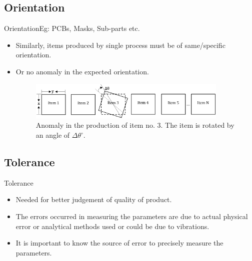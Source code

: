 \documentclass{beamer}
\begin{document}
\subsection{Orientation}

\begin{frame}{Orientation}{Eg: PCBs, Masks, Sub-parts etc.}
  \begin{itemize}
  \item Similarly, items produced by single process must be of same/specific orientation.
  \item Or no anomaly in the expected orientation.
  \begin{figure}
    \includegraphics[width=0.9\textwidth]{orientation}
    \caption{Anomaly in the production of item no. $3$. The item is rotated by an angle of $\Delta\theta^\circ$.}
    \label{fig:orientation_line}
  \end{figure}
  \end{itemize}
\end{frame}

\subsection{Tolerance}

\begin{frame}{Tolerance}
  \begin{itemize}
  \item Needed for better judgement of quality of product.
  \item The errors occurred in measuring the parameters are due to actual physical error or analytical methods used or could be due to vibrations.
  \item It is important to know the source of error to precisely measure the parameters.
  \end{itemize}
\end{frame}
\end{document}
